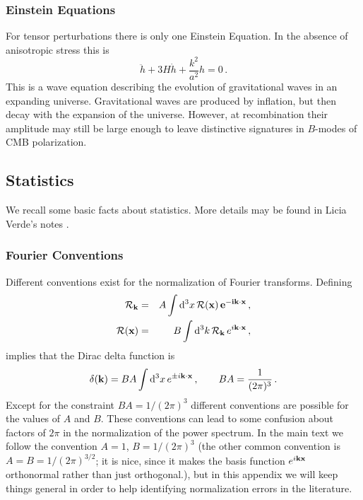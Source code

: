 \documentclass[12pt,letterpaper,rotate]{article}
\def\beq{\begin{equation}}
\def\eeq{\end{equation}}
\def\bea{\begin{eqnarray}}
\def\eea{\end{eqnarray}}
\def\d{{\rm d}}
\def\R{{\cal R}}
\newtheorem{thm}{Exercise}
\begin{document}
{\subsubsection{Einstein Equations}

For tensor perturbations there is only one Einstein Equation.
In the absence of anisotropic stress this is
\beq
\ddot h + 3H \dot h + \frac{k^2}{a^2} h = 0\, .
\eeq
This is a wave equation describing the evolution of gravitational waves in an expanding universe.
Gravitational waves are produced by inflation, but then decay with the expansion of the universe.
However, at recombination their amplitude may still be large enough to leave distinctive signatures in $B$-modes of CMB polarization.







\newpage
\subsection{Statistics}

We recall some basic facts about statistics.
More details may be found in Licia Verde's notes \cite{LiciaStats}.


\subsubsection{Fourier Conventions}%

Different conventions exist for the normalization of Fourier transforms. Defining
\bea
\R_{\bf k} &=& A \int \d^3 x \, \R(\bf x) \, e^{-i {\bf k} \cdot {\bf x}} \label{equ:F1} \, ,\\
\R({\bf x}) &=& B \int \d^3 k \, \R_{\bf k} \, e^{i {\bf k} \cdot {\bf x}}\, ,
\eea
implies that the
Dirac delta function is
\beq
\delta({\bf k}) =  B A \int \d^3 x\, e^{\pm i {\bf k} \cdot {\bf x}}\, , \qquad BA = \frac{1}{(2\pi)^3}\, .
\eeq
Except for the constraint $BA = 1/(2\pi)^3$ different conventions are possible for the values of $A$ and $B$.
These conventions can lead to some confusion about factors of $2\pi$ in the normalization of the power spectrum.
In the main text we follow the convention $A=1$, $B= 1/(2\pi)^{3}$ (the other common convention is $A=B=1/(2\pi)^{3/2}$; it is nice, since it makes the basis function $e^{i{\bf k} {\bf x}}$ orthonormal rather than just orthogonal.), but in this appendix we will keep things general in order to help identifying normalization errors in the literature.


}
\end{document}
